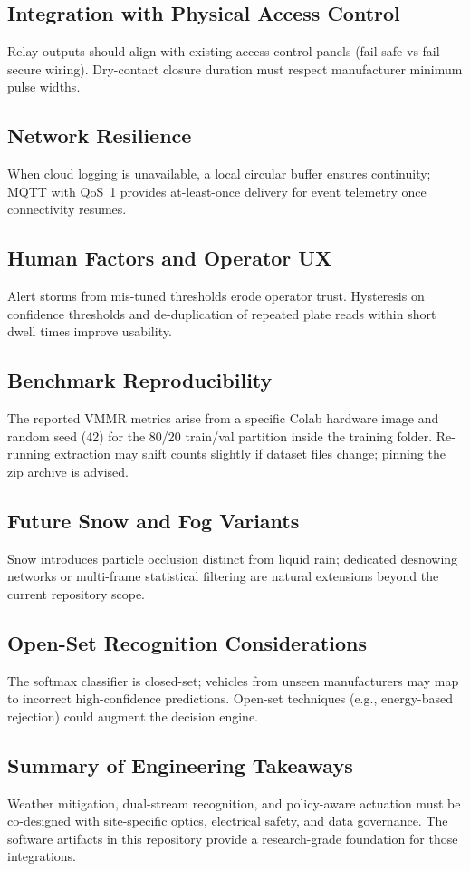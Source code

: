 \subsection{Integration with Physical Access Control}
Relay outputs should align with existing access control panels (fail-safe vs fail-secure wiring). Dry-contact closure duration must respect manufacturer minimum pulse widths.

\subsection{Network Resilience}
When cloud logging is unavailable, a local circular buffer ensures continuity; MQTT with QoS~1 provides at-least-once delivery for event telemetry once connectivity resumes.

\subsection{Human Factors and Operator UX}
Alert storms from mis-tuned thresholds erode operator trust. Hysteresis on confidence thresholds and de-duplication of repeated plate reads within short dwell times improve usability.

\subsection{Benchmark Reproducibility}
The reported VMMR metrics arise from a specific Colab hardware image and random seed (42) for the 80/20 train/val partition inside the training folder. Re-running extraction may shift counts slightly if dataset files change; pinning the zip archive is advised.

\subsection{Future Snow and Fog Variants}
Snow introduces particle occlusion distinct from liquid rain; dedicated desnowing networks or multi-frame statistical filtering are natural extensions beyond the current repository scope.

\subsection{Open-Set Recognition Considerations}
The softmax classifier is closed-set; vehicles from unseen manufacturers may map to incorrect high-confidence predictions. Open-set techniques (e.g., energy-based rejection) could augment the decision engine.

\subsection{Summary of Engineering Takeaways}
Weather mitigation, dual-stream recognition, and policy-aware actuation must be co-designed with site-specific optics, electrical safety, and data governance. The software artifacts in this repository provide a research-grade foundation for those integrations.
